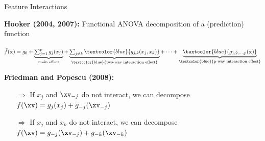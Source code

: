\documentclass[11pt,compress,t,notes=noshow, aspectratio=169, xcolor=table,dvipsnames]{beamer}
\newcommand{\highlight}[1]{\colorbox{orange}{$\displaystyle #1$}}
\begin{document}
\begin{frame}{Feature Interactions}

\textbf{Hooker (2004, 2007):} Functional ANOVA decomposition of a (prediction) function%

\begin{center}
    $\textstyle
\hat{f}(\mathbf{x}) = g_0 + 
\underbrace{\textstyle\sum_{j=1}^{p} {{g_j(x_j)}}}_{\text{{main effect}}} + 
\underbrace{\textstyle\sum_{j \neq k} {\textcolor{blue}{g_{j,k}(x_j, x_k)}}}_{\text{\textcolor{blue}{two-way interaction effect}}} + 
\cdots + 
\underbrace{{\textcolor{blue}{g_{1,2,\ldots,p}(\mathbf{x})}}}_{\text{\textcolor{blue}{p-way interaction effect}}}
$
\end{center}

\textbf{Friedman and Popescu (2008):} %



\begin{itemize}
    \item[$\Rightarrow$] If $x_j$ and $\xv_{-j}$ do not interact, we can decompose $f(\xv) = g_{j}(x_{j}) + g_{-j}(\xv_{-j})$
    \item[$\Rightarrow$] If $x_j$ and $x_k$ do not interact, we can decompose $f(\xv) = g_{-j}(\xv_{-j}) + g_{-k}(\xv_{-k})$
\end{itemize}






\end{frame}
\end{document}
